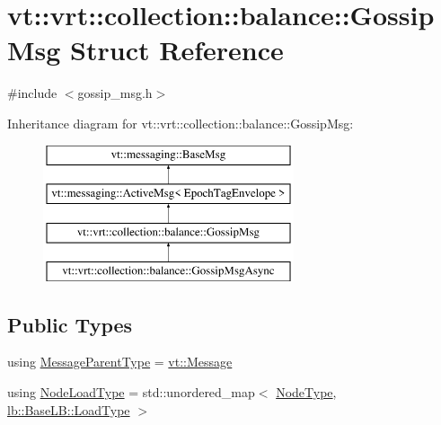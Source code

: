 \hypertarget{structvt_1_1vrt_1_1collection_1_1balance_1_1_gossip_msg}{}\section{vt\+:\+:vrt\+:\+:collection\+:\+:balance\+:\+:Gossip\+Msg Struct Reference}
\label{structvt_1_1vrt_1_1collection_1_1balance_1_1_gossip_msg}


{\ttfamily \#include $<$gossip\+\_\+msg.\+h$>$}

Inheritance diagram for vt\+:\+:vrt\+:\+:collection\+:\+:balance\+:\+:Gossip\+Msg\+:\begin{figure}[H]
\begin{center}
\leavevmode
\includegraphics[height=4.000000cm]{structvt_1_1vrt_1_1collection_1_1balance_1_1_gossip_msg}
\end{center}
\end{figure}
\subsection*{Public Types}
\begin{DoxyCompactItemize}
\item 
using \hyperlink{structvt_1_1vrt_1_1collection_1_1balance_1_1_gossip_msg_a640e492438ba6fd6c8affa25ed0f17fc}{Message\+Parent\+Type} = \hyperlink{namespacevt_a3a3ddfef40b4c90915fa43cdd5f129ea}{vt\+::\+Message}
\item 
using \hyperlink{structvt_1_1vrt_1_1collection_1_1balance_1_1_gossip_msg_a8deef056cb137cfd67540a31be189122}{Node\+Load\+Type} = std\+::unordered\+\_\+map$<$ \hyperlink{namespacevt_a866da9d0efc19c0a1ce79e9e492f47e2}{Node\+Type}, \hyperlink{structvt_1_1vrt_1_1collection_1_1lb_1_1_base_l_b_a215e22b9f12678303f49615ae3be05cc}{lb\+::\+Base\+L\+B\+::\+Load\+Type} $>$
\end{DoxyCompactItemize}

